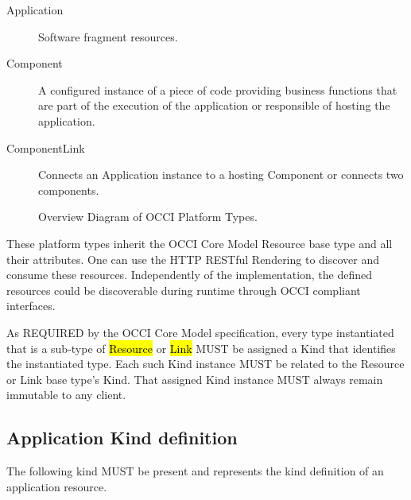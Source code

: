 \documentclass[10pt,a4paper]{article}
\begin{document}
\begin{description}
  \item[Application] Software fragment resources.
  \item[Component] A configured instance of a piece of code providing business functions that are part of the execution of the application or responsible of hosting the application.
  \item[ComponentLink] Connects an Application instance to a hosting Component or connects two components.
\end{description}

\begin{figure}[!h]
	{\centering {} \par}
	\caption{Overview Diagram of OCCI Platform Types.}
	\label{fig:platform_uml}
\end{figure}

These platform types inherit the OCCI Core Model Resource base type and all their attributes. One can use the HTTP RESTful Rendering to discover and consume these resources. Independently of the implementation, the defined resources could be discoverable during runtime through OCCI compliant interfaces.

As REQUIRED by the OCCI Core Model specification, every type instantiated that is a  sub-type of \hl{Resource} or \hl{Link} MUST be assigned a Kind that identifies the instantiated type. Each such Kind instance MUST be related to the Resource or Link base type's Kind. That assigned Kind instance MUST always remain immutable to any client.

\subsection{Application Kind definition}
The following kind MUST be present and represents the kind definition of an application resource. 
\end{document}
